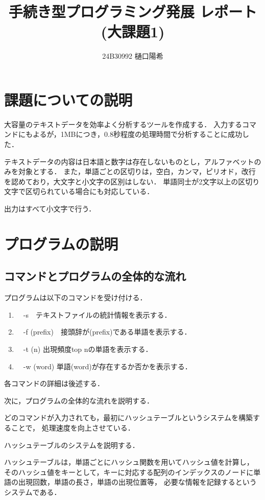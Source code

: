 \documentclass{jsarticle}
\title{手続き型プログラミング発展 レポート(大課題1)}
\author{24B30992 樋口陽希}
\date{}
\begin{document}
\maketitle

\section{課題についての説明}
大容量のテキストデータを効率よく分析するツールを作成する．
入力するコマンドにもよるが，1MBにつき，0.8秒程度の処理時間で分析することに成功した．

テキストデータの内容は日本語と数字は存在しないものとし，アルファベットのみを対象とする．
また，単語ごとの区切りは，空白，カンマ，ピリオド，改行を認めており，大文字と小文字の区別はしない．
単語同士が2文字以上の区切り文字で区切られている場合にも対応している．

出力はすべて小文字で行う．

\section{プログラムの説明}
  \subsection{コマンドとプログラムの全体的な流れ}
  プログラムは以下のコマンドを受け付ける．
    \begin{enumerate}
      \item　-s　テキストファイルの統計情報を表示する．
      \item　-f (prefix)　接頭辞が(prefix)である単語を表示する．
      \item　-t (n) 出現頻度top nの単語を表示する．
      \item　-w (word) 単語(word)が存在するか否かを表示する．
    \end{enumerate}
    各コマンドの詳細は後述する．
    
    次に，プログラムの全体的な流れを説明する．
    
    どのコマンドが入力されても，最初にハッシュテーブルというシステムを構築することで，
    処理速度を向上させている．
    
    ハッシュテーブルのシステムを説明する．

    ハッシュテーブルは，単語ごとにハッシュ関数を用いてハッシュ値を計算し，
    そのハッシュ値をキーとして，キーに対応する配列のインデックスのノードに単語の出現回数，単語の長さ，単語の出現位置等，
    必要な情報を記録するというシステムである．
\end{document}
